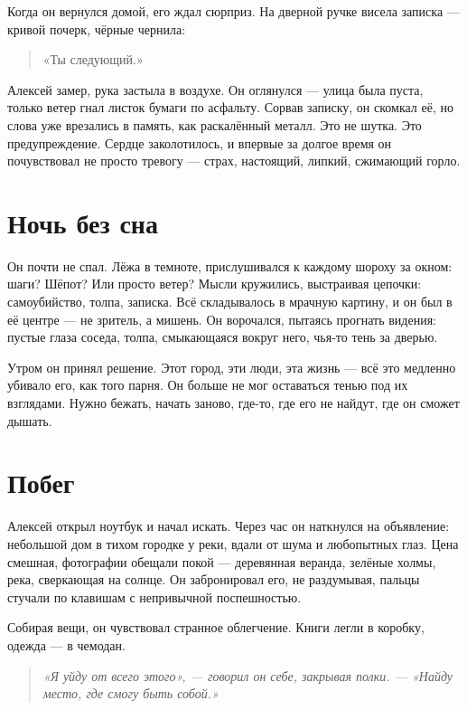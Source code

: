 \documentclass[12pt,a4paper]{book}
\newenvironment{innerthought}{\begin{quote}\small\itshape}{\end{quote}}
\begin{document}
Когда он вернулся домой, его ждал сюрприз. На дверной ручке висела записка — кривой почерк, чёрные чернила: 

\begin{quote}
«Ты следующий.»
\end{quote}

Алексей замер, рука застыла в воздухе. Он оглянулся — улица была пуста, только ветер гнал листок бумаги по асфальту. Сорвав записку, он скомкал её, но слова уже врезались в память, как раскалённый металл. Это не шутка. Это предупреждение. Сердце заколотилось, и впервые за долгое время он почувствовал не просто тревогу — страх, настоящий, липкий, сжимающий горло.

\section{Ночь без сна}

Он почти не спал. Лёжа в темноте, прислушивался к каждому шороху за окном: шаги? Шёпот? Или просто ветер? Мысли кружились, выстраивая цепочки: самоубийство, толпа, записка. Всё складывалось в мрачную картину, и он был в её центре — не зритель, а мишень. Он ворочался, пытаясь прогнать видения: пустые глаза соседа, толпа, смыкающаяся вокруг него, чья-то тень за дверью.

Утром он принял решение. Этот город, эти люди, эта жизнь — всё это медленно убивало его, как того парня. Он больше не мог оставаться тенью под их взглядами. Нужно бежать, начать заново, где-то, где его не найдут, где он сможет дышать.

\section{Побег}

Алексей открыл ноутбук и начал искать. Через час он наткнулся на объявление: небольшой дом в тихом городке у реки, вдали от шума и любопытных глаз. Цена смешная, фотографии обещали покой — деревянная веранда, зелёные холмы, река, сверкающая на солнце. Он забронировал его, не раздумывая, пальцы стучали по клавишам с непривычной поспешностью.

Собирая вещи, он чувствовал странное облегчение. Книги легли в коробку, одежда — в чемодан. 

\begin{innerthought}
«Я уйду от всего этого», — говорил он себе, закрывая полки. — «Найду место, где смогу быть собой.»
\end{innerthought}
\end{document}
